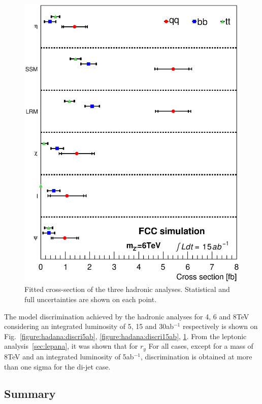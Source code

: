 \begin{figure}[h]
  \centering

    \includegraphics[width=0.45\columnwidth]{Fig/27tev/Zp_branching_6TeV_15ab.eps}

    \caption{Fitted cross-section of the three hadronic analyses. Statistical and full uncertainties are shown on each point.}

  \label{figure:hadana:discri30ab}
\end{figure}

The model discrimination achieved by the hadronic analyses for 4, 6 and 8TeV considering an integrated luminosity of 
5, 15 and 30ab$^{-1}$ respectively is shown on Fig.~\ref{figure:hadana:discri5ab}, \ref{figure:hadana:discri15ab}, \ref{figure:hadana:discri30ab}.
From the leptonic analysis~\ref{sec:lepana}, it was shown that for $r_y$ 
For all cases, except for a mass of 8TeV and an integrated luminosity of 5ab$^{-1}$, discrimination is obtained at more than one sigma for the di-jet case.


\subsection{Summary}
